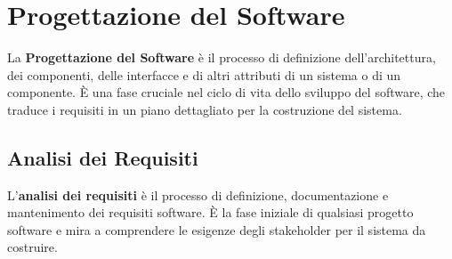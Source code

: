 \chapter{Progettazione del Software}

La \textbf{Progettazione del Software} è il processo di definizione dell'architettura, dei componenti, delle interfacce e di altri attributi di un sistema o di un componente. È una fase cruciale nel ciclo di vita dello sviluppo del software, che traduce i requisiti in un piano dettagliato per la costruzione del sistema.

\section{Analisi dei Requisiti}
L'\textbf{analisi dei requisiti} è il processo di definizione, documentazione e mantenimento dei requisiti software. È la fase iniziale di qualsiasi progetto software e mira a comprendere le esigenze degli stakeholder per il sistema da costruire.

